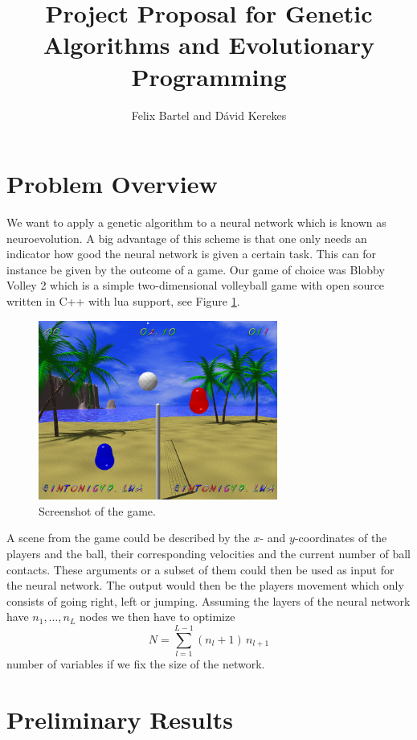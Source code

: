 \documentclass[11pt,a4paper]{scrartcl}
\date{}
\title{Project Proposal for Genetic Algorithms and Evolutionary Programming}
\author{Felix Bartel and D\'avid Kerekes}
\begin{document}
\maketitle

\section{Problem Overview}

We want to apply a genetic algorithm to a neural network which is known as neuroevolution.
A big advantage of this scheme is that one only needs an indicator how good the neural network is given a certain task.
This can for instance be given by the outcome of a game.
Our game of choice was Blobby Volley 2 which is a simple two-dimensional volleyball game with open source written in C++ with lua support, see Figure \ref{fig:screenshot}.

\begin{figure}[H]
\center
\includegraphics[width=0.7\textwidth]{img/screenshot.png}
\caption{Screenshot of the game.}
\label{fig:screenshot}
\end{figure}

A scene from the game could be described by the $x$- and $y$-coordinates of the players and the ball, their corresponding velocities and the current number of ball contacts.
These arguments or a subset of them could then be used as input for the neural network.
The output would then be the players movement which only consists of going right, left or jumping.
Assuming the layers of the neural network have $n_1,\dots,n_L$ nodes we then have to optimize \[N = \sum_{l=1}^{L-1} (n_l+1) \, n_{l+1}\] number of variables if we fix the size of the network.

\section*{Preliminary Results}
\end{document}
